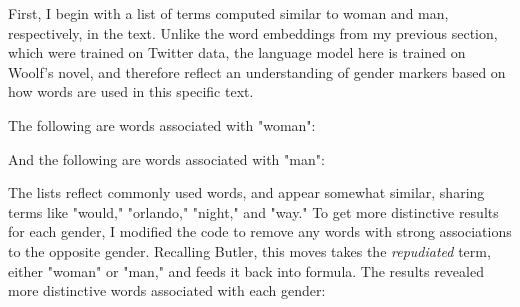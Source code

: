 \documentclass[11pt]{article}
\begin{document}
First, I begin with a list of terms computed similar to woman and man,
respectively, in the text. Unlike the word embeddings from my previous
section, which were trained on Twitter data, the language model here
is trained on Woolf's novel, and therefore reflect an understanding of
gender markers based on how words are used in this specific text.

The following are words associated with "woman":

\begin{SOURCE}
\end{SOURCE}

And the following are words associated with "man":

\begin{SOURCE}
\end{SOURCE}

The lists reflect commonly used words, and appear somewhat similar,
sharing terms like "would," "orlando," "night," and "way." To get more
distinctive results for each gender, I modified the code to remove any
words with strong associations to the opposite gender. Recalling
Butler, this moves takes the \emph{repudiated} term, either "woman" or
"man," and feeds it back into formula. The results revealed more
distinctive words associated with each gender:
\end{document}
